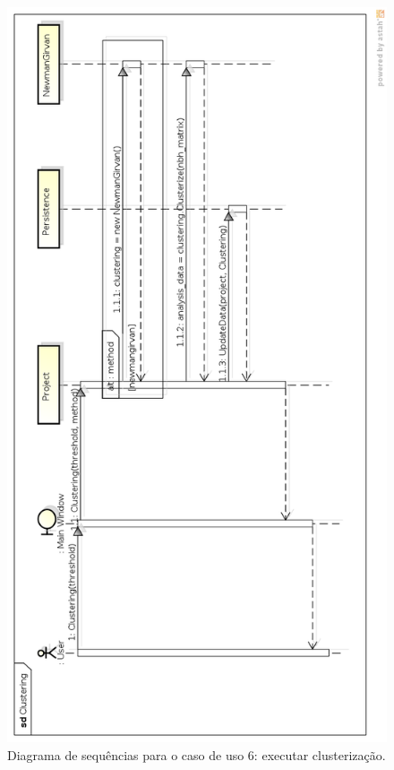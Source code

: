\begin{figure}
\centering
\includegraphics[scale=0.47]{clustering}
\caption{Diagrama de sequências para o caso de uso 6: executar clusterização.}
\label{fig:clustering}
\end{figure}

